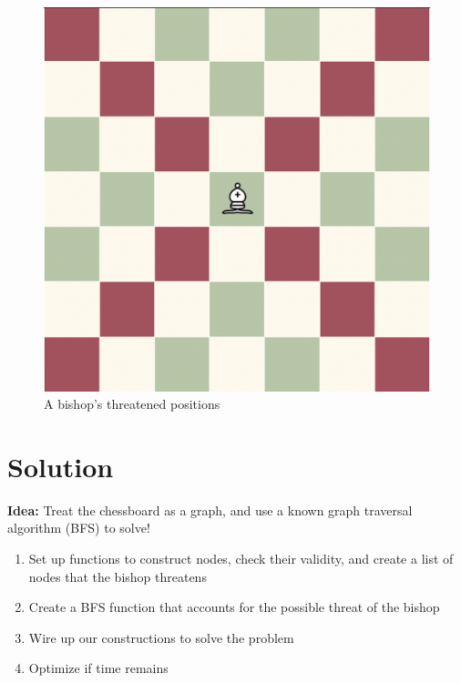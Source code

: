 \documentclass[11pt]{exam}
\begin{document}
\begin{figure}[H]
	\centering
	\includegraphics[width=0.7\linewidth]{bishop_moves.png}
    \caption{A bishop's threatened positions}
\end{figure}


\newpage
\section*{Solution}
\textbf{Idea:} Treat the chessboard as a graph, and use a known graph traversal algorithm (BFS) to solve!
\begin{enumerate}
	\item Set up functions to construct nodes, check their validity, and create a list of nodes that the bishop threatens
	\item Create a BFS function that accounts for the possible threat of the bishop
	\item Wire up our constructions to solve the problem
	\item Optimize if time remains
\end{enumerate}
\end{document}
